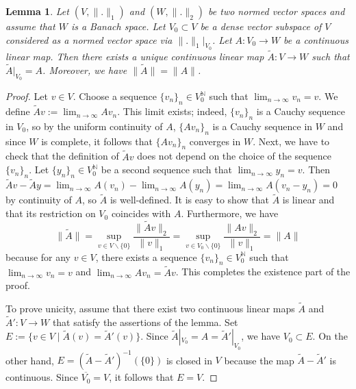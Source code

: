 \documentclass[12pt, oneside, a4paper]{article}
\newtheorem{lem}[thm]{Lemma}
\theoremstyle{dfn}
\def\Nbb{\mathbb{N}}
\providecommand{\norm}[1]{\lVert#1\rVert}
\begin{document}
\begin{lem}\label{lemma:ContinuousExtension}
Let $(V,\norm{.}_1)$ and $(W,\norm{.}_2)$ be two normed vector spaces and assume that $W$ is a Banach space. Let $V_0 \subset V$ be a dense vector subspace of $V$ considered as a normed vector space via $\norm{.}_1|_{V_0}$. Let $A \colon V_0 \to W$ be a continuous linear map. Then there exists a unique continuous linear map $\widetilde{A} \colon V \to W$ such that $\widetilde{A}|_{V_0} = A$. Moreover, we have $\norm{\widetilde{A}} = \norm{A}$.
\end{lem}

\begin{proof}
Let $v \in V$. Choose a sequence $\{v_n\}_n \in V_0^\Nbb$ such that $\lim_{n \to \infty} v_n = v$. We define $\widetilde{A} v := \lim_{n \to \infty} Av_n$. This limit exists; indeed, $\{v_n\}_n$ is a Cauchy sequence in $V_0$, so by the uniform continuity of $A$, $\{Av_n\}_n$ is a Cauchy sequence in $W$ and since $W$ is complete, it follows that $\{Av_n\}_n$ converges in $W$. Next, we have to check that the definition of $\widetilde{A} v$ does not depend on the choice of the sequence $\{v_n\}_n$. Let $\{y_n\}_n \in V_0^\Nbb$ be a second sequence such that $\lim_{n \to \infty} y_n = v$. Then $\widetilde{A} v - \widetilde{A} y = \lim_{n\to\infty} A(v_n) - \lim_{n\to\infty} A(y_n) = \lim_{n \to \infty}A(v_n - y_n) = 0$ by continuity of $A$, so $\widetilde{A}$ is well-defined. It is easy to show that $\widetilde{A}$ is linear and that its restriction on $V_0$ coincides with $A$. Furthermore, we have
\[
\norm{\widetilde{A}}
= \sup_{v \in V \smallsetminus \{0\}} \frac{\norm{\widetilde{A}v}_2}{\norm{v}_1}
= \sup_{v \in V_0 \smallsetminus \{0\}} \frac{\norm{Av}_2}{\norm{v}_1}
= \norm{A}
\]
because for any $v \in V$, there exists a sequence $\{v_n\}_n \in V_0^\Nbb$ such that $\lim_{n \to \infty} v_n = v$ and $\lim_{n \to \infty} Av_n = \widetilde{A}v$. This completes the existence part of the proof.

To prove unicity, assume that there exist two continuous linear maps $\widetilde{A}$ and $\widetilde{A}' \colon V \to W$ that satisfy the assertions of the lemma. Set $E := \{v \in V \mid \widetilde{A}(v) = \widetilde{A}'(v)\}$. Since $\widetilde{A}|_{V_0} = A = \widetilde{A}'|_{V_0}$, we have $V_0 \subset E$. On the other hand, $E = (\widetilde{A} - \widetilde{A}')^{-1}(\{0\})$ is closed in $V$ because the map $\widetilde{A} - \widetilde{A}'$ is continuous. Since $\overline{V_0} = V$, it follows that $E = V$.
\end{proof}
\end{document}
